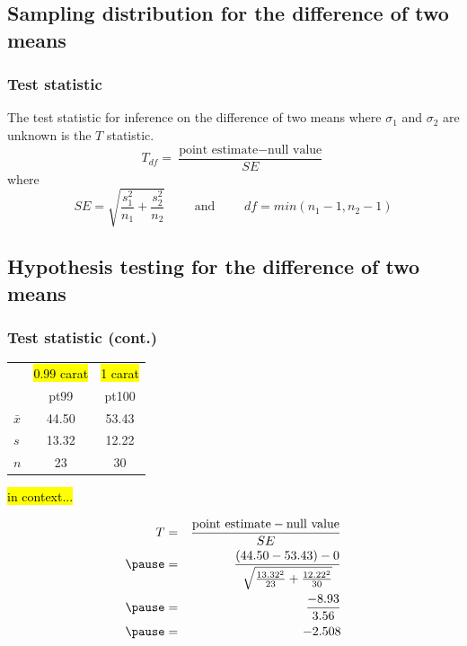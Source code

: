 \documentclass[notes,11pt, aspectratio=169]{beamer}
\begin{document}

\subsection{Sampling distribution for the difference of two means}


\begin{frame}
\frametitle{Test statistic}

{The test statistic for inference on the difference of two means where $\sigma_1$ and $\sigma_2$ are unknown is the $T$ statistic.
\[ T_{df} = \frac{\text{point estimate} - \text{null value}}{SE} \]
where 
\[ SE = \sqrt{ \frac{s_1^2}{n_1} + \frac{s_2^2}{n_2} } \qquad \text{ and } \qquad df = min(n_1 - 1, n_2 - 1) \]
}


\end{frame}


\subsection{Hypothesis testing for the difference of two means}


\begin{frame}
\frametitle{Test statistic (cont.)}

{\small
\begin{center}
\begin{tabular}{l | c | c}
		& {\footnotesize \hl{0.99 carat}} &  {\footnotesize \hl{1 carat}}  \\
		& pt99	& pt100 \\
\hline
$\bar{x}$	& 44.50		& 53.43 \\
$s$		& 13.32		& 12.22 \\
$n$		& 23			& 30
\end{tabular}
\end{center}
}

\hl{in context...}

\pause

{\small
\begin{eqnarray*}
T &=& \frac{\text{point estimate} - \text{null value} }{SE} \\
\pause
&=& \frac{(44.50 - 53.43) - 0}{ \sqrt{\frac{13.32^2}{23} + \frac{12.22^2}{30} }} \\
\pause
&=& \frac{-8.93}{3.56} \\
\pause
&=& -2.508
\end{eqnarray*}
}

\end{frame}
\end{document}
